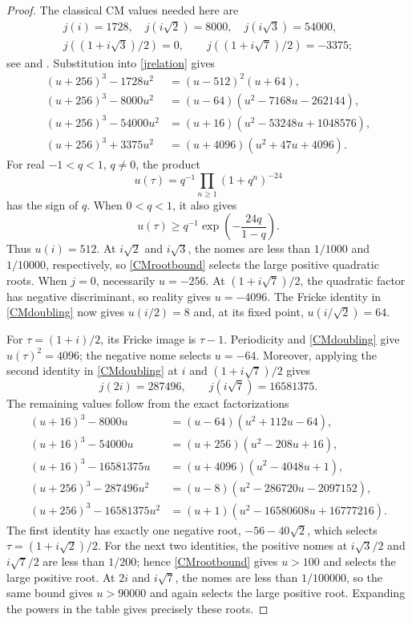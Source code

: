 \documentclass[11pt]{amsart}
\theoremstyle{definition}
\theoremstyle{remark}
\numberwithin{equation}{section}
\begin{document}
\begin{proof}
The classical CM values needed here are
\begin{gather*}
 j(i)=1728,\quad j(i\sqrt2)=8000,\quad j(i\sqrt3)=54000,\\
 j((1+i\sqrt3)/2)=0,\qquad j((1+i\sqrt7)/2)=-3375;
\end{gather*}
see \cite[\S6.1, p.~71]{Zagier} and \cite{Cox}. Substitution into \eqref{jrelation} gives
\begin{align*}
 (u+256)^3-1728u^2&=(u-512)^2(u+64),\\
 (u+256)^3-8000u^2&=(u-64)(u^2-7168u-262144),\\
 (u+256)^3-54000u^2&=(u+16)(u^2-53248u+1048576),\\
 (u+256)^3+3375u^2&=(u+4096)(u^2+47u+4096).
\end{align*}
For real $-1<q<1$, $q\ne0$, the product
\[
 u(\tau)=q^{-1}\prod_{n\ge1}(1+q^n)^{-24}
\]
has the sign of $q$. When $0<q<1$, it also gives
\begin{equation}\label{CMrootbound}
 u(\tau)\ge q^{-1}\exp\!\left(-\frac{24q}{1-q}\right).
\end{equation}
Thus $u(i)=512$. At $i\sqrt2$ and $i\sqrt3$, the nomes are less than $1/1000$ and $1/10000$, respectively, so \eqref{CMrootbound} selects the large positive quadratic roots. When $j=0$, necessarily $u=-256$. At $(1+i\sqrt7)/2$, the quadratic factor has negative discriminant, so reality gives $u=-4096$. The Fricke identity in \eqref{CMdoubling} now gives $u(i/2)=8$ and, at its fixed point, $u(i/\sqrt2)=64$.

For $\tau=(1+i)/2$, its Fricke image is $\tau-1$. Periodicity and \eqref{CMdoubling} give $u(\tau)^2=4096$; the negative nome selects $u=-64$. Moreover, applying the second identity in \eqref{CMdoubling} at $i$ and $(1+i\sqrt7)/2$ gives
\[
 j(2i)=287496,\qquad j(i\sqrt7)=16581375.
\]
The remaining values follow from the exact factorizations
\begin{align*}
 (u+16)^3-8000u&=(u-64)(u^2+112u-64),\\
 (u+16)^3-54000u&=(u+256)(u^2-208u+16),\\
 (u+16)^3-16581375u&=(u+4096)(u^2-4048u+1),\\
 (u+256)^3-287496u^2&=(u-8)(u^2-286720u-2097152),\\
 (u+256)^3-16581375u^2&=(u+1)(u^2-16580608u+16777216).
\end{align*}
The first identity has exactly one negative root, $-56-40\sqrt2$, which selects $\tau=(1+i\sqrt2)/2$. For the next two identities, the positive nomes at $i\sqrt3/2$ and $i\sqrt7/2$ are less than $1/200$; hence \eqref{CMrootbound} gives $u>100$ and selects the large positive root. At $2i$ and $i\sqrt7$, the nomes are less than $1/100000$, so the same bound gives $u>90000$ and again selects the large positive root. Expanding the powers in the table gives precisely these roots.


\end{proof}
\end{document}
